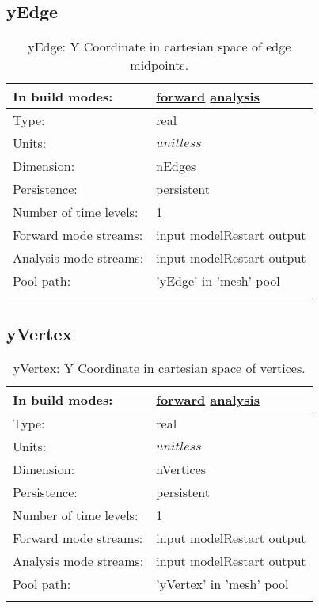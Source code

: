 \subsection[yEdge]{yEdge}
\label{subsec:var_sec_mesh_yEdge}
\begin{center}
\begin{longtable}{| p{2.0in} | p{4.0in} |}
        \hline 
        In build modes: & \hyperref[subsec:forward_var_tab_mesh]{forward} \hyperref[subsec:analysis_var_tab_mesh]{analysis} \\
        \hline 
        Type: & real \\
        \hline 
        Units: & $unitless$ \\
        \hline 
        Dimension: & nEdges \\
        \hline 
        Persistence: & persistent \\
        \hline 
        Number of time levels: & 1 \\
        \hline 
		 Forward mode streams: &  input modelRestart output \\
        \hline 
		 Analysis mode streams: &  input modelRestart output \\
        \hline 
            Pool path: & 'yEdge' in 'mesh' pool
 \\
		 \hline 
    \caption{yEdge: Y Coordinate in cartesian space of edge midpoints.}
\end{longtable}
\end{center}
\subsection[yVertex]{yVertex}
\label{subsec:var_sec_mesh_yVertex}
\begin{center}
\begin{longtable}{| p{2.0in} | p{4.0in} |}
        \hline 
        In build modes: & \hyperref[subsec:forward_var_tab_mesh]{forward} \hyperref[subsec:analysis_var_tab_mesh]{analysis} \\
        \hline 
        Type: & real \\
        \hline 
        Units: & $unitless$ \\
        \hline 
        Dimension: & nVertices \\
        \hline 
        Persistence: & persistent \\
        \hline 
        Number of time levels: & 1 \\
        \hline 
		 Forward mode streams: &  input modelRestart output \\
        \hline 
		 Analysis mode streams: &  input modelRestart output \\
        \hline 
            Pool path: & 'yVertex' in 'mesh' pool
 \\
		 \hline 
    \caption{yVertex: Y Coordinate in cartesian space of vertices.}
\end{longtable}
\end{center}
